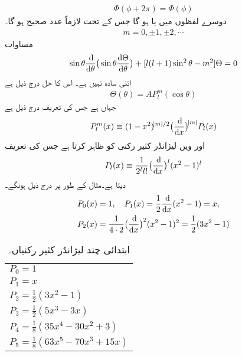 \begin{align}
\Phi(\phi+2\pi)=\Phi(\phi) 
\end{align}
دوسرے لفظوں میں   یا  ہو گا جس کے تحت  لازماً عدد صحیح ہو گا۔
\begin{align}
m=0,\pm 1,\pm 2,\cdots
\end{align}
 مساوات  
\begin{align}
\sin{\theta}\frac{\dif}{\dif{\theta}}\big(\sin{\theta}\frac{\dif{\Theta}}{\dif{\theta}}\big)+[l(l+1)\sin^{2}{\theta}-m^{2}]\Theta=0 
\end{align}
اتنی سادہ نہیں ہے۔ اس کا حل درج ذیل ہے
\begin{align}
\Theta(\theta)=AP_{l}^{m}(\cos{\theta}) 
\end{align}
جہاں      ہے جس کی تعریف درج ذیل ہے
\begin{align}\label{مساوات_ابعادی_شریک_لیژانڈر_تفاعلات_تعریف}
P_{l}^{m}(x)\equiv (1-x^{2})^{\abs{m}/2}\big(\frac{\dif}{\dif{x}}\big)^{\abs{m}}P_{l}(x) 
\end{align}
اور  ویں لیژانڈر کثیر رکنی  کو     ظاہر کرتا ہے جس کی تعریف 
\begin{align}
P_{l}(x)\equiv\frac{1}{2^{l}l!}\big(\frac{\dif}{\dif{x}}\big)^{l}(x^{2}-1)^{l} 
\end{align}
دیتا ہے۔مثال کے طور پر درج ذیل ہونگے۔
\begin{align*}
P_{0}(x)&=1,\quad P_{1}(x)=\frac{1}{2}\frac{\dif}{\dif{x}}(x^{2}-1)=x ,\\
P_{2}(x)&=\frac{1}{4\cdot 2}\big(\frac{\dif}{\dif{x}}\big)^{2}(x^{2}-1)^{2}=\frac{1}{2}(3x^{2}-1) 
\end{align*}
%
\begin{table}
\caption{ابتدائی چند لیژانڈر کثیر رکنیاں۔}
\label{جدول_ابعاد_لیژانڈر_چند_ابتدائی}
\centering
\begin{tabular}{l}
$P_0=1$\\[0.25em]
$P_1=x$\\[0.25em]
$P_2=\frac{1}{2}(3x^2-1)$\\[0.25em]
$P_3=\frac{1}{2}(5x^3-3x)$\\[0.25em]
$P_4=\frac{1}{8}(35x^4-30x^2+3)$\\[0.25em]
$P_5=\frac{1}{8}(63x^5-70x^3+15x)$
\end{tabular}
\end{table}
